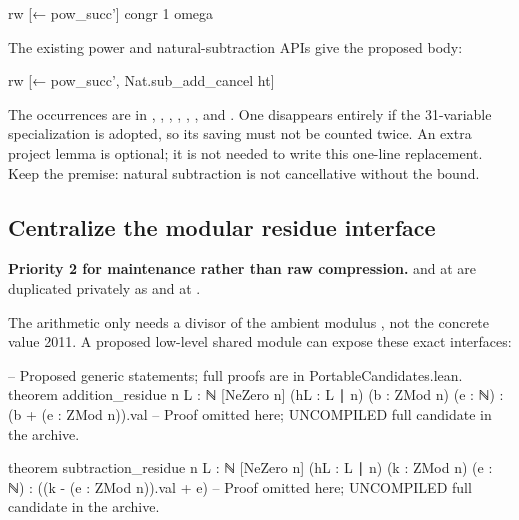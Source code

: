 \begin{Lean}
  rw [← pow_succ']
  congr 1
  omega
\end{Lean}

The existing power and natural-subtraction APIs give the proposed body:

\begin{Lean}
  rw [← pow_succ', Nat.sub_add_cancel ht]
\end{Lean}

The occurrences are in
,
,
,
,
,
, and
.
One disappears entirely if the 31-variable specialization is adopted, so
its saving must not be counted twice. An extra project lemma is optional;
it is not needed to write this one-line replacement. Keep the 
premise: natural subtraction is not cancellative without the bound.

\subsection{Centralize the modular residue interface}
\label{sec:residue}

\textbf{Priority 2 for maintenance rather than raw compression.}
 and
 at
 are duplicated privately as
 and  at
.

The arithmetic only needs a divisor  of the ambient modulus
, not the concrete value 2011. A proposed low-level shared module
can expose these exact interfaces:

\begin{Lean}
-- Proposed generic statements; full proofs are in PortableCandidates.lean.
theorem addition_residue {n L : ℕ} [NeZero n] (hL : L ∣ n)
    (b : ZMod n) (e : ℕ) :
    (b + (e : ZMod n)).val %
  -- Proof omitted here; UNCOMPILED full candidate in the archive.

theorem subtraction_residue {n L : ℕ} [NeZero n] (hL : L ∣ n)
    (k : ZMod n) (e : ℕ) :
    ((k - (e : ZMod n)).val + e) %
  -- Proof omitted here; UNCOMPILED full candidate in the archive.
\end{Lean}

